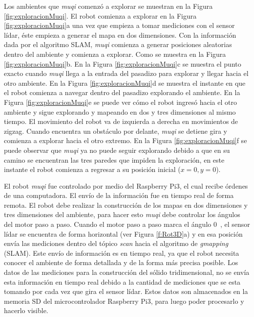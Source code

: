 Los ambientes que \textit{muqi} comenzó a explorar se muestran en la Figura 
\ref{fig:exploracionMuqi}. El robot comienza a explorar en la Figura 
\ref{fig:exploracionMuqi}a una vez que empieza a tomar mediciones con el sensor 
lídar, éste empieza a generar el mapa en dos dimensiones. Con la información
dada por el algoritmo SLAM, \textit{muqi} comienza a generar posiciones aleatorias 
dentro del ambiente y comienza a explorar. Como se muestra en la Figura 
\ref{fig:exploracionMuqi}b. En la Figura \ref{fig:exploracionMuqi}c se muestra el 
punto exacto cuando \textit{muqi} llega a la entrada del pasadizo para explorar y 
llegar hacia el otro ambiente. En la Figura \ref{fig:exploracionMuqi}d se 
muestra el instante en que el robot comienza a navegar dentro del pasadizo explorando 
el ambiente. En la Figura \ref{fig:exploracionMuqi}e se puede ver cómo el robot ingresó 
hacia el otro ambiente y sigue explorando y mapeando en dos y tres dimensiones al 
mismo tiempo. El movimiento del robot va de izquierda a derecha en movimientos de 
zigzag. Cuando encuentra un obstáculo por delante, \textit{muqi} se detiene gira y 
comienza a explorar hacia el otro extremo. En la Figura \ref{fig:exploracionMuqi}f 
se puede observar que \textit{muqi} ya no puede seguir explorando debido a que en 
su camino se encuentran las tres paredes que impiden la exploración, en este 
instante el robot comienza a regresar a su posición inicial ($x = 0, y = 0$).

El robot \textit{muqi} fue controlado por medio del Raspberry Pi3, el 
cual recibe órdenes de una computadora. El envío de la información fue en 
tiempo real de forma remota. El robot debe realizar la construcción de los mapas en 
dos dimensiones y tres dimensiones del ambiente, para hacer esto \textit{muqi} debe 
controlar los ángulos del motor paso a paso. Cuando el motor paso a paso marca el 
ángulo 0~\grad, el sensor lídar se encuentra de forma horizontal (ver Figura \ref{f:Rot3D}a) 
y en esa posición envía las mediciones dentro del tópico \textit{scan} hacia el 
algoritmo de \textit{gmapping} (SLAM). Este envío de información es en tiempo real, ya 
que el robot necesita conocer el ambiente de forma detallada y de la forma más precisa posible. 
Los datos de las mediciones para la construcción del sólido tridimensional, no se envía
esta información en tiempo real debido a la cantidad de mediciones que se esta tomando por 
cada vez que gira el sensor lídar. Estos datos son almacenados en la memoria SD del 
microcontrolador Raspberry Pi3, para luego poder procesarlo y hacerlo visible.

